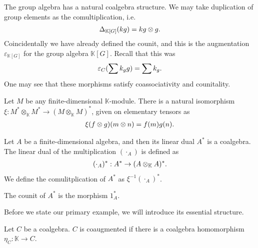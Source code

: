 \documentclass[../thesis.tex]{subfiles}
\begin{document}
            \begin{example}
                The group algebra has a natural coalgebra structure. We may take duplication of group elements as the comultiplication, i.e.
                \begin{align*}
                    \Delta_{\mathbb{K}[G]}(kg) = kg\otimes g\tt{.}
                \end{align*}
                Coincidentally we have already defined the counit, and this is the augmentation $\varepsilon_{\mathbb{K}[G]}$ for the group algebra $\mathbb{K}[G]$. Recall that this was
                \begin{align*}
                    \varepsilon_C(\sum k_gg) = \sum k_g\tt{.}
                \end{align*}
                One may see that these morphisms satisfy coassociativity and counitality.
            \end{example}
            \begin{example}
                Let $M$ be any finite-dimensional $\mathbb{K}$-module. There is a natural isomorphism $\xi : M^* \otimes_\mathbb{K} M^* \rightarrow (M \otimes_\mathbb{K} M)^*$, given on elementary tensors as
                \begin{align*}
                    \xi(f \otimes g)(m \otimes n) = f(m)g(n)\tt{.}
                \end{align*}

                Let $A$ be a finite-dimensional algebra, and then its linear dual $A^*$ is a coalgebra. The linear dual of the multiplication $(\cdot_A)$ is defined as 
                \begin{align*}
                    (\cdot_A)^* : A^* \rightarrow (A\otimes_\mathbb{K}A)^*\tt{.}
                \end{align*}
                We define the comulitplication of $A^*$ as $\xi^{-1}(\cdot_A)^*$.

                The counit of $A^*$ is the morphism $1_A^*$.
            \end{example}

            Before we state our primary example, we will introduce its essential structure.

            \begin{definition}
                Let $C$ be a coalgebra. $C$ is coaugmented if there is a coalgebra homomorphism $\eta_C:\mathbb{K}\rightarrow C$.
            \end{definition}
\end{document}
